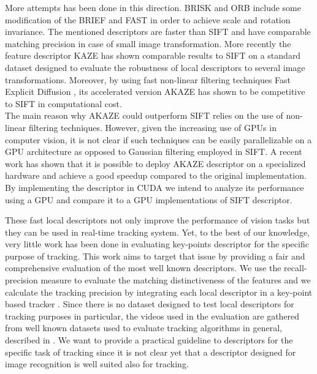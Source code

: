 \documentclass[letterpaper, 10pt, conference]{ieeeconf}
\begin{document}
More attempts has been done in this direction. BRISK \cite{leutenegger11} and ORB \cite{rublee11} include some modification of the BRIEF and FAST in order to achieve scale and rotation invariance. The mentioned descriptors are faster than SIFT and have comparable matching precision in case of small image transformation. More recently the feature descriptor KAZE \cite{alcantarilla12} has shown comparable results to SIFT on a standard dataset \cite{mikolajczyk05} designed to evaluate the robustness of local descriptors to several image transformations. Moreover, by using fast non-linear filtering techniques Fast Explicit Diffusion \cite{goesele2010}, its accelerated version AKAZE \cite{alcantarilla13} has shown to be competitive to SIFT in computational cost.\\
The main reason why AKAZE could outperform SIFT relies on the use of non-linear filtering techniques. However, given the increasing use of GPUs in computer vision, it is not clear if such techniques can be easily parallelizable on a GPU architecture as opposed to Gaussian filtering employed in SIFT. A recent work \cite{jiang2015} has shown that it is possible to deploy AKAZE descriptor on a specialized hardware and achieve a good speedup compared to the original implementation. By implementing the descriptor in CUDA we intend to analyze its performance using a GPU and compare it to a GPU implementations of SIFT descriptor.


These fast local descriptors not only improve the performance of vision tasks but they can be used in real-time tracking system. Yet, to the best of our knowledge, very little work has been done in evaluating key-points descriptor for the specific purpose of tracking. This work aims to target that issue by providing a fair and comprehensive evaluation of the most well known descriptors. We use the recall-precision measure to evaluate the matching distinctiveness of the features and we calculate the tracking precision by integrating each local descriptor in a key-point based tracker \cite{pieropan15}. Since there is no dataset designed to test local descriptors for tracking purposes in particular, the videos used in the evaluation are gathered from well known datasets used to evaluate tracking algorithms in general, described in \cite{wu2013,nebehay2014,hare2011}. We want to provide a practical guideline to descriptors for the specific task of tracking since it is not clear yet that a descriptor designed for image recognition is well suited also for tracking.
 
\end{document}
